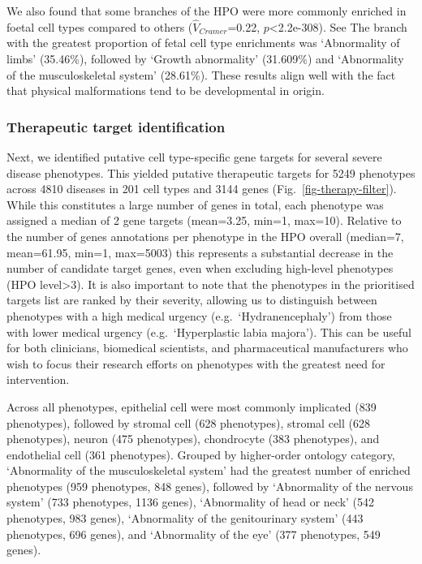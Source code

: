 \documentclass[
]{agujournal2019}
\begin{document}
We also found that some branches of the HPO were more commonly enriched
in foetal cell types compared to others (\(\hat{V}_{Cramer}\)=0.22,
\(p\)\textless2.2e-308). See The branch with the greatest proportion of
fetal cell type enrichments was `Abnormality of limbs' (35.46\%),
followed by `Growth abnormality' (31.609\%) and `Abnormality of the
musculoskeletal system' (28.61\%). These results align well with the
fact that physical malformations tend to be developmental in origin.

\subsubsection{Therapeutic target
identification}\label{therapeutic-target-identification}

Next, we identified putative cell type-specific gene targets for several
severe disease phenotypes. This yielded putative therapeutic targets for
5249 phenotypes across 4810 diseases in 201 cell types and 3144 genes
(Fig.~\ref{fig-therapy-filter}). While this constitutes a large number
of genes in total, each phenotype was assigned a median of 2 gene
targets (mean=3.25, min=1, max=10). Relative to the number of genes
annotations per phenotype in the HPO overall (median=7, mean=61.95,
min=1, max=5003) this represents a substantial decrease in the number of
candidate target genes, even when excluding high-level phenotypes (HPO
level\textgreater3). It is also important to note that the phenotypes in
the prioritised targets list are ranked by their severity, allowing us
to distinguish between phenotypes with a high medical urgency
(e.g.~`Hydranencephaly') from those with lower medical urgency
(e.g.~`Hyperplastic labia majora'). This can be useful for both
clinicians, biomedical scientists, and pharmaceutical manufacturers who
wish to focus their research efforts on phenotypes with the greatest
need for intervention.

Across all phenotypes, epithelial cell were most commonly implicated
(839 phenotypes), followed by stromal cell (628 phenotypes), stromal
cell (628 phenotypes), neuron (475 phenotypes), chondrocyte (383
phenotypes), and endothelial cell (361 phenotypes). Grouped by
higher-order ontology category, `Abnormality of the musculoskeletal
system' had the greatest number of enriched phenotypes (959 phenotypes,
848 genes), followed by `Abnormality of the nervous system' (733
phenotypes, 1136 genes), `Abnormality of head or neck' (542 phenotypes,
983 genes), `Abnormality of the genitourinary system' (443 phenotypes,
696 genes), and `Abnormality of the eye' (377 phenotypes, 549 genes).
\end{document}
